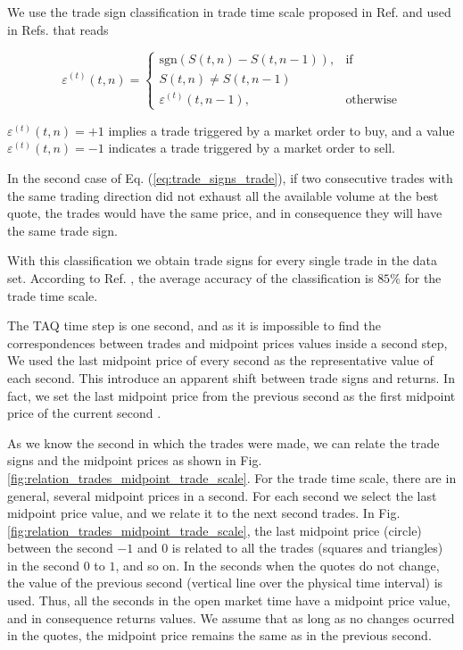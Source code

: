 We use the trade sign classification in trade time scale proposed in Ref.
\cite{Wang_2016_cross} and used in Refs.
\cite{Wang_2017,Wang_2018_copulas,Wang_2016_avg} that reads

\begin{equation}\label{eq:trade_signs_trade}
    \varepsilon^{\left(t\right)}\left(t,n\right)=\left\{
    \begin{array}{cc}
    \text{sgn}\left(S\left(t,n\right)-S\left(t,n-1\right)\right),
    & \text{if }\\ S\left(t,n\right) \ne S\left(t,n-1\right)\\
    \varepsilon^{\left(t\right)}\left(t,n-1\right),
    & \text{otherwise}
    \end{array}\right.
\end{equation}

$\varepsilon^{\left(t\right)}\left( t,n \right) = +1$ implies a trade triggered
by a market order to buy, and a value
$\varepsilon^{\left(t\right)}\left( t,n \right) = -1$ indicates a trade
triggered by a market order to sell.

In the second case of Eq. (\ref{eq:trade_signs_trade}), if two consecutive
trades with the same trading direction did not exhaust all the available volume
at the best quote, the trades would have the same price, and in consequence
they will have the same trade sign.

With this classification we obtain trade signs for every single trade in the
data set. According to Ref. \cite{Wang_2016_cross}, the average accuracy of the
classification is $85\%$ for the trade time scale.

The TAQ time step is one second, and as it is impossible to find the
correspondences between trades and midpoint prices values inside a second step,
We used the last midpoint price of every second as the representative value of
each second. This introduce an apparent shift between trade signs and returns.
In fact, we set the last midpoint price from the previous second as the first
midpoint price of the current second \cite{Wang_2016_cross}.

As we know the second in which the trades were made, we can relate the trade
signs and the midpoint prices as shown in Fig.
\ref{fig:relation_trades_midpoint_trade_scale}. For the trade time scale, there
are in general, several midpoint prices in a second. For each second we select
the last midpoint price value, and we relate it to the next second trades. In
Fig. \ref{fig:relation_trades_midpoint_trade_scale}, the last midpoint price
(circle) between the second $-1$ and $0$ is related to all the trades (squares
and triangles) in the second $0$ to $1$, and so on. In the seconds when the
quotes do not change, the value of the previous second (vertical line over the
physical time interval) is used. Thus, all the seconds in the open market time
have a midpoint price value, and in consequence returns values. We assume that
as long as no changes ocurred in the quotes, the midpoint price remains the
same as in the previous second.

